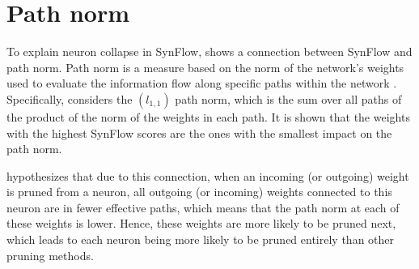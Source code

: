 \section{Path norm}
To explain neuron collapse in SynFlow, \textcite{frankle21} shows a connection between SynFlow and path norm. Path norm is a measure based on the norm of the network's weights used to evaluate the information flow along specific paths within the network \autocite{neyshabur15}. Specifically, \textcite{frankle21} considers the $(l_{1,1})$ path norm, which is the sum over all paths of the product of the norm of the weights in each path. It is shown that the weights with the highest SynFlow scores are the ones with the smallest impact on the path norm.

\textcite{frankle21} hypothesizes that due to this connection, when an incoming (or outgoing) weight is pruned from a neuron, all outgoing (or incoming) weights connected to this neuron are in fewer effective paths, which means that the path norm at each of these weights is lower. Hence, these weights are more likely to be pruned next, which leads to each neuron being more likely to be pruned entirely than other pruning methods.
